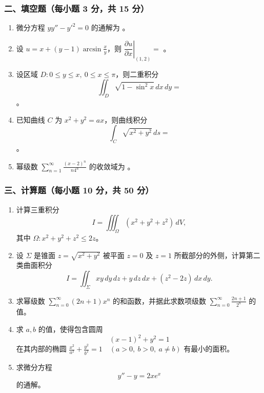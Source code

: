 \subsubsection*{二、填空题（每小题 3 分，共 15 分）}
\begin{enumerate}
  \item 微分方程 \(\displaystyle yy''-y'^2=0\) 的通解为 \underline{\hspace{4cm}}。
  \item 设 \(\displaystyle u=x+(y-1)\arcsin\frac{x}{y}\)，则 $\left.\dfrac{\partial u}{\partial x}\right|_{(1,2)}=$ \underline{\hspace{3cm}}。
  \item 设区域 \(\displaystyle D:0\le y\le x,\ 0\le x\le\pi\)，则二重积分
  \[
  \iint_D \sqrt{1-\sin^2x}\,dx\,dy=
  \]
  \underline{\hspace{3cm}}。
  \item 已知曲线 $C$ 为 \(\displaystyle x^2+y^2=ax\)，则曲线积分
  \[
  \int_C\sqrt{x^2+y^2}\,ds=
  \]
  \underline{\hspace{3cm}}。
  \item 幂级数 \(\displaystyle \sum_{n=1}^{\infty}\frac{(x-2)^n}{n4^n}\) 的收敛域为 \underline{\hspace{4cm}}。
\end{enumerate}

\subsubsection*{三、计算题（每小题 10 分，共 50 分）}
\begin{enumerate}
  \item 计算三重积分
  \[
  I=\iiint_\Omega (x^2+y^2+z^2)\,dV,
  \]
  其中 $\Omega:x^2+y^2+z^2\le2z$。
  \item 设 $\Sigma$ 是锥面 $z=\sqrt{x^2+y^2}$ 被平面 $z=0$ 及 $z=1$ 所截部分的外侧，计算第二类曲面积分
  \[
  I=\iint_\Sigma xy\,dy\,dz+y\,dz\,dx+(z^2-2z)\,dx\,dy.
  \]
  \item 求幂级数 \(\displaystyle \sum_{n=0}^{\infty}(2n+1)x^n\) 的和函数，并据此求数项级数 \(\displaystyle \sum_{n=0}^{\infty}\frac{2n+1}{2^n}\) 的值。
  \item 求 $a,b$ 的值，使得包含圆周
  \[
  (x-1)^2+y^2=1
  \]
  在其内部的椭圆 \(\displaystyle \frac{x^2}{a^2}+\frac{y^2}{b^2}=1\quad(a>0,\ b>0,\ a\ne b)\) 有最小的面积。
  \item 求微分方程
  \[
  y''-y=2xe^x
  \]
  的通解。
\end{enumerate}

